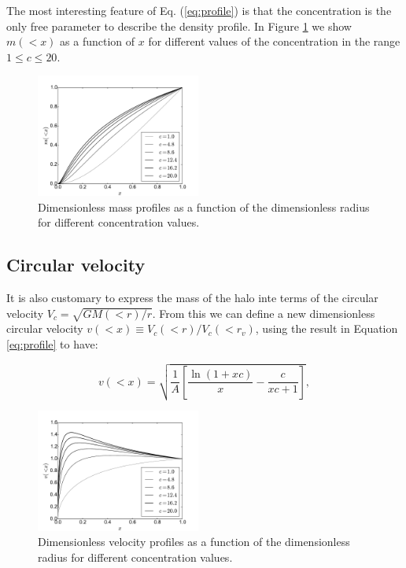 \documentclass[useAMS,usenatbib]{mn2e}
\begin{document}
The most interesting feature of Eq. (\ref{eq:profile}) is that the
concentration is the only free parameter to describe the density
profile. In Figure \ref{fig:profiles} we show $m(<x)$ as 
a function of $x$ for different values of the concentration in the range
$1\leq c \leq 20$.  

\begin{figure}
\begin{center}
  \includegraphics[width=0.48\textwidth]{nfw_normalized.pdf}
\end{center}
\caption{Dimensionless mass profiles as a function of the
  dimensionless radius for different concentration values.
    \label{fig:profiles}}
\end{figure}

\subsection{Circular velocity}

It is also customary to express the mass of the halo inte terms of the
circular velocity $V_{c}=\sqrt{GM(<r)/r}$. From this we can
define a new dimensionless circular velocity $v(<x)\equiv
V_{c}(<r)/V_{c}(<r_v)$, using the result in Equation \ref{eq:profile}
to have:

\begin{equation}
v(<x)=\sqrt{\frac{1}{A}\left[\frac{\ln\left(1+xc\right)}{x}-\frac{c}{xc+1}\right]},
\end{equation}

\begin{figure}
\begin{center}
  \includegraphics[width=0.48\textwidth]{vel_normalized.pdf}
\end{center}
\caption{Dimensionless velocity profiles as a function of the
  dimensionless radius for different concentration values.
    \label{fig:velocity}}
\end{figure}
\end{document}
